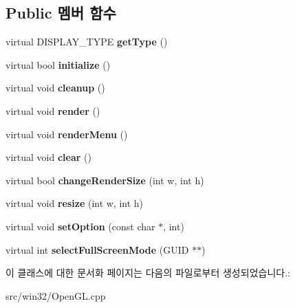 \subsection*{Public 멤버 함수}
\begin{DoxyCompactItemize}
\item 
\mbox{\label{class_open_g_l_display_a82bec99b2136823801a0cf90813de9c2}} 
virtual D\+I\+S\+P\+L\+A\+Y\+\_\+\+T\+Y\+PE {\bfseries get\+Type} ()
\item 
\mbox{\label{class_open_g_l_display_af0db619c7083f43e9bc61f1705843b53}} 
virtual bool {\bfseries initialize} ()
\item 
\mbox{\label{class_open_g_l_display_a870bdc3cf12a50ff23755e1869f9026e}} 
virtual void {\bfseries cleanup} ()
\item 
\mbox{\label{class_open_g_l_display_aa0ae6cc7e0a15da37e167d6f91590c49}} 
virtual void {\bfseries render} ()
\item 
\mbox{\label{class_open_g_l_display_a55b32d45baec33ca6f800e5d847cb8f4}} 
virtual void {\bfseries render\+Menu} ()
\item 
\mbox{\label{class_open_g_l_display_abef343fb8d951b4bc63bd3b7afe285a2}} 
virtual void {\bfseries clear} ()
\item 
\mbox{\label{class_open_g_l_display_aa0dc96c6070cadf3eb6e52875a72b449}} 
virtual bool {\bfseries change\+Render\+Size} (int w, int h)
\item 
\mbox{\label{class_open_g_l_display_aac55119e649c9530a19b6b02fcd4910b}} 
virtual void {\bfseries resize} (int w, int h)
\item 
\mbox{\label{class_open_g_l_display_ad92750f75fabf5873f8626cb154f29b9}} 
virtual void {\bfseries set\+Option} (const char $\ast$, int)
\item 
\mbox{\label{class_open_g_l_display_aade9c3229c9fc024ad55b3d1419499e8}} 
virtual int {\bfseries select\+Full\+Screen\+Mode} (G\+U\+ID $\ast$$\ast$)
\end{DoxyCompactItemize}


이 클래스에 대한 문서화 페이지는 다음의 파일로부터 생성되었습니다.\+:\begin{DoxyCompactItemize}
\item 
src/win32/Open\+G\+L.\+cpp\end{DoxyCompactItemize}
